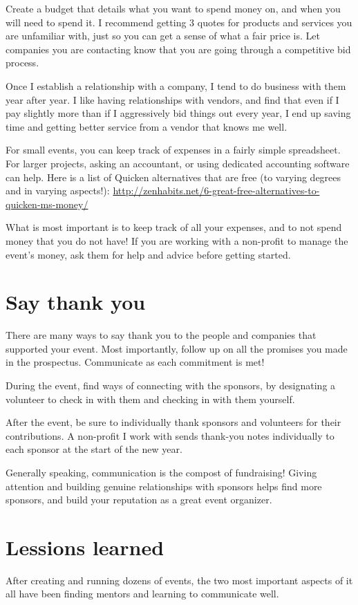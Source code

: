 Create a budget that details what you want to spend money on, and when you will
need to spend it. I recommend getting 3 quotes for products and services you are
unfamiliar with, just so you can get a sense of what a fair price is. Let
companies you are contacting know that you are going through a competitive bid
process. 

Once I establish a relationship with a company, I tend to do business with them
year after year. I like having relationships with vendors, and find that even if
I pay slightly more than if I aggressively bid things out every year, I end up
saving time and getting better service from a vendor that knows me well. 

For small events, you can keep track of expenses in a fairly simple spreadsheet.
For larger projects, asking an accountant, or using dedicated accounting software
can help. Here is a list of Quicken alternatives that are free (to varying degrees
and in varying aspects!): \url{http://zenhabits.net/6-great-free-alternatives-to-quicken-ms-money/}

What is most important is to keep track of all your expenses, and to not spend
money that you do not have! If you are working with a non-profit to manage the
event’s money, ask them for help and advice before getting started.

\section*{Say thank you}
There are many ways to say thank you to the people and companies that supported
your event. Most importantly, follow up on all the promises you made in the
prospectus. Communicate as each commitment is met!

During the event, find ways of connecting with the sponsors, by designating a
volunteer to check in with them and checking in with them yourself.

After the event, be sure to individually thank sponsors and volunteers for their
contributions. A non-profit I work with sends thank-you notes individually to
each sponsor at the start of the new year.

Generally speaking, communication is the compost of fundraising! Giving
attention and building genuine relationships with sponsors helps find more
sponsors, and build your reputation as a great event organizer.

\section*{Lessions learned}
After creating and running dozens of events, the two most important aspects of
it all have been finding mentors and learning to communicate well. 

